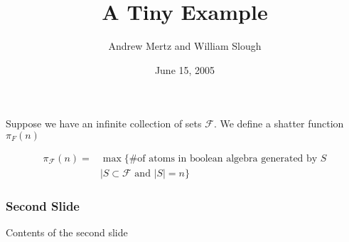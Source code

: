 \documentclass{beamer}
\title{A Tiny Example}
\author{Andrew Mertz and William Slough}
\date{June 15, 2005}
\newcommand{\F}{\mathcal F}
\begin{document}
\maketitle

\begin{frame}
	Suppose we have an infinite collection of sets $\F$. We define a shatter function $\pi_F(n)$

	\begin{align*}
		\pi_\F(n) = &\max \{ \text {\# of atoms in boolean algebra generated by $S$} \\
		            &\mid S \subset \F \text{ and } |S| = n\}
	\end{align*}
\end{frame}

\begin{frame}
	\frametitle{Second Slide}
	Contents of the second slide
\end{frame}
\end{document}

